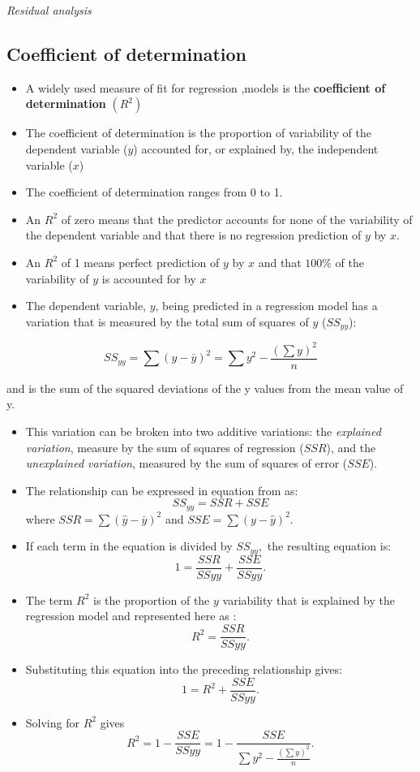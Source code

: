 \documentclass[]{book}
\providecommand{\tightlist}{%
  \setlength{\itemsep}{0pt}\setlength{\parskip}{0pt}}
\begin{document}
\newpage

\emph{Residual analysis}

\newpage

\hypertarget{coefficient-of-determination}{%
\subsection{Coefficient of determination}\label{coefficient-of-determination}}

\begin{itemize}
\tightlist
\item
  A widely used measure of fit for regression ,models is the \textbf{coefficient of determination} \((R^2)\)
\item
  The coefficient of determination is the proportion of variability of the dependent variable (\(y\)) accounted for, or explained by, the independent variable (\(x\))
\item
  The coefficient of determination ranges from 0 to 1.
\item
  An \(R^2\) of zero means that the predictor accounts for none of the variability of the dependent variable and that there is no regression prediction of \(y\) by \(x\).
\item
  An \(R^2\) of 1 means perfect prediction of \(y\) by \(x\) and that \(100\%\) of the variability of \(y\) is accounted for by \(x\)
\item
  The dependent variable, \(y\), being predicted in a regression model has a variation that is measured by the total sum of squares of \(y\) (\(SS_{yy}\)):
\end{itemize}

\[SS_{yy} = \sum(y-\bar{y})^2= \sum y^2 - \frac{(\sum y)^2}{n}\]

and is the sum of the squared deviations of the y values from the mean value of y.

\begin{itemize}
\tightlist
\item
  This variation can be broken into two additive variations: the \emph{explained variation}, measure by the sum of squares of regression (\(SSR\)), and the \emph{unexplained variation}, measured by the sum of squares of error (\(SSE\)).
\item
  The relationship can be expressed in equation from as:
  \[SS_{yy}=SSR+SSE\]
  where \(SSR = \sum (\hat{y} -\bar{y})^2\) and \(SSE= \sum (y-\hat{y})^2\).
\item
  If each term in the equation is divided by \(SS_{yy},\) the resulting equation is:
  \[1=\frac{SSR}{SS{yy}}+ \frac{SSE}{SS{yy}}.\]
\item
  The term \(R^2\) is the proportion of the \(y\) variability that is explained by the regression model and represented here as :
  \[R^2= \frac{SSR}{SS{yy}}.\]
\item
  Substituting this equation into the preceding relationship gives:
  \[1=R^2+ \frac{SSE}{SS{yy}}.\]
\item
  Solving for \(R^2\) gives
  \[R^2=1- \frac{SSE}{SS{yy}}= 1-\frac{SSE}{\sum{y^2}- \frac{(\sum y)^2}{n}}.\]
\end{itemize}
\end{document}
